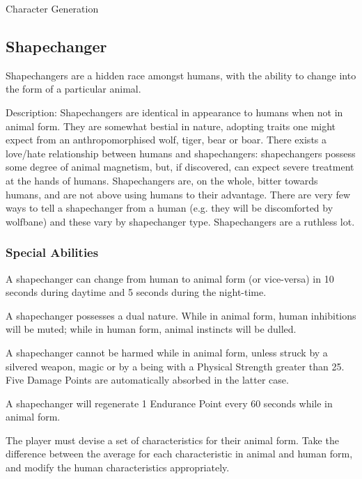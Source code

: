 \begin{Chapter}{Character Generation}
\subsection{Shapechanger}


Shapechangers are a hidden race amongst humans, with the ability to
change into the form of a particular animal.

Description: Shapechangers are identical in appearance to humans when
not in animal form.  They are somewhat bestial in nature, adopting
traits one might expect from an anthropomorphised wolf, tiger, bear or
boar.  There exists a love/hate relationship between humans and
shapechangers: shapechangers possess some degree of animal magnetism,
but, if discovered, can expect severe treatment at the hands of
humans.  Shapechangers are, on the whole, bitter towards humans, and
are not above using humans to their advantage.  There are very few
ways to tell a shapechanger from a human (e.g.  they will be
discomforted by wolfbane) and these vary by shapechanger type.
Shapechangers are a ruthless lot.

\subsubsection{Special Abilities}

\begin{Enumerate}

\item A shapechanger can change from human to animal form (or
  vice-versa) in 10 seconds during daytime and 5 seconds during the
  night-time.

\item A shapechanger possesses a dual nature.  While in animal form,
  human inhibitions will be muted; while in human form, animal
  instincts will be dulled.

\item A shapechanger cannot be harmed while in animal form, unless
  struck by a silvered weapon, magic or by a being with a Physical
  Strength greater than 25.  Five Damage Points are automatically
  absorbed in the latter case.

\item A shapechanger will regenerate 1 Endurance Point every 60
  seconds while in animal form.

\item The player must devise a set of characteristics for their animal
  form. Take the difference between the average for each
  characteristic in animal and human form, and modify the human
  characteristics appropriately.


\end{Enumerate}
\end{Chapter}
